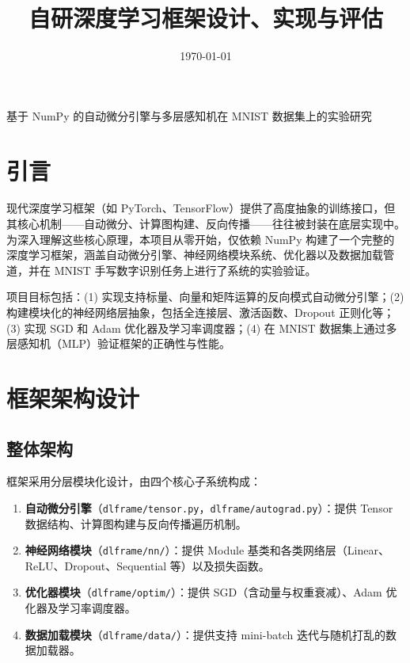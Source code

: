 \documentclass[12pt,a4paper]{ctexart}
\title{\textbf{自研深度学习框架设计、实现与评估}}
\author{}
\date{\today}
\begin{document}
\maketitle

\begin{center}
基于 NumPy 的自动微分引擎与多层感知机在 MNIST 数据集上的实验研究
\end{center}

\vspace{1cm}

\section{引言}

现代深度学习框架（如 PyTorch、TensorFlow）提供了高度抽象的训练接口，但其核心机制——自动微分、计算图构建、反向传播——往往被封装在底层实现中。为深入理解这些核心原理，本项目从零开始，仅依赖 NumPy 构建了一个完整的深度学习框架，涵盖自动微分引擎、神经网络模块系统、优化器以及数据加载管道，并在 MNIST 手写数字识别任务上进行了系统的实验验证。

项目目标包括：(1) 实现支持标量、向量和矩阵运算的反向模式自动微分引擎；(2) 构建模块化的神经网络层抽象，包括全连接层、激活函数、Dropout 正则化等；(3) 实现 SGD 和 Adam 优化器及学习率调度器；(4) 在 MNIST 数据集上通过多层感知机（MLP）验证框架的正确性与性能。

\section{框架架构设计}

\subsection{整体架构}

框架采用分层模块化设计，由四个核心子系统构成：

\begin{enumerate}
    \item \textbf{自动微分引擎}（\texttt{dlframe/tensor.py}，\texttt{dlframe/autograd.py}）：提供 Tensor 数据结构、计算图构建与反向传播遍历机制。
    \item \textbf{神经网络模块}（\texttt{dlframe/nn/}）：提供 Module 基类和各类网络层（Linear、ReLU、Dropout、Sequential 等）以及损失函数。
    \item \textbf{优化器模块}（\texttt{dlframe/optim/}）：提供 SGD（含动量与权重衰减）、Adam 优化器及学习率调度器。
    \item \textbf{数据加载模块}（\texttt{dlframe/data/}）：提供支持 mini-batch 迭代与随机打乱的数据加载器。
\end{enumerate}
\end{document}
